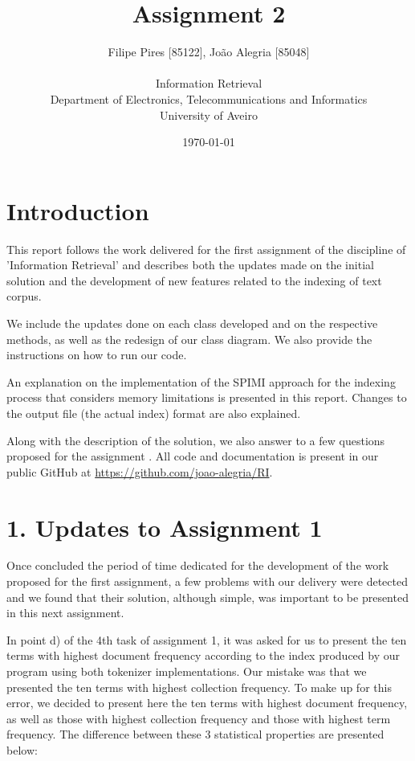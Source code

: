 \documentclass[12pt]{article}
\title{Assignment 2}
\author
{Filipe Pires [85122], João Alegria [85048]\\
\\
Information Retrieval\\
\normalsize{Department of Electronics, Telecommunications and Informatics}\\
\normalsize{University of Aveiro}\\
}
\date{\today{}}
\begin{document}
 
\baselineskip18pt
\maketitle 

\section*{Introduction}

This report follows the work delivered for the first assignment of the 
discipline of 'Information Retrieval' and describes both the updates made
on the initial solution and the development of new features related to the
indexing of text corpus.

We include the updates done on each class developed and on the respective
methods, as well as the redesign of our class diagram.
We also provide the instructions on how to run our code.

An explanation on the implementation of the SPIMI approach for the indexing
process that considers memory limitations is presented in this report.
Changes to the output file (the actual index) format are also explained.

Along with the description of the solution, we also answer to a few questions
proposed for the assignment \cite{assign2}.
All code and documentation is present in our public GitHub at 
\newline \url{https://github.com/joao-alegria/RI}. 

\newpage
\section*{1. Updates to Assignment 1}

Once concluded the period of time dedicated for the development of the work 
proposed for the first assignment, a few problems with our delivery were
detected and we found that their solution, although simple, was important to
be presented in this next assignment.

In point d) of the 4th task of assignment 1, it was asked for us to present
the ten terms with highest document frequency according to the index produced
by our program using both tokenizer implementations.
Our mistake was that we presented the ten terms with highest collection 
frequency. To make up for this error, we decided to present here the ten terms
with highest document frequency, as well as those with highest collection 
frequency and those with highest term frequency.
The difference between these 3 statistical properties are presented below:
\end{document}
